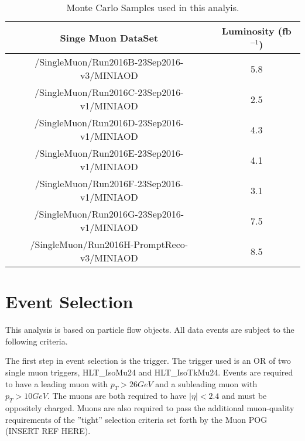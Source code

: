 \documentclass[
10pt, %
a4paper, %
oneside, %
headinclude,footinclude, %
BCOR5mm, %
]{scrartcl}
\begin{document}
\begin{table}[htp]
    \centering
    \label{tab:mcsets}

 \caption{ Monte Carlo Samples used in this analyis.}
\begin{tabular}{|| c c ||}
    \hline
    \textbf{Singe Muon DataSet}  & \textbf{Luminosity (fb$^{-1}$)}\\
 \hline \hline

  /SingleMuon/Run2016B-23Sep2016-v3/MINIAOD   &   {\small 5.8}  \\
  /SingleMuon/Run2016C-23Sep2016-v1/MINIAOD    &  {\small 2.5}  \\
  /SingleMuon/Run2016D-23Sep2016-v1/MINIAOD    &  {\small 4.3}  \\ 
  /SingleMuon/Run2016E-23Sep2016-v1/MINIAOD    &  {\small 4.1}  \\
  /SingleMuon/Run2016F-23Sep2016-v1/MINIAOD    &  {\small 3.1}  \\
  /SingleMuon/Run2016G-23Sep2016-v1/MINIAOD    &  {\small 7.5}  \\
  /SingleMuon/Run2016H-PromptReco-v3/MINIAOD   &  {\small 8.5}  \\  



 \hline

 \end{tabular}

\end{table}

\section{Event Selection}

This analysis is based on particle flow objects. All data events are subject to the following criteria.

The first step in event selection is the trigger. The trigger used is an OR of two single muon triggers, HLT\_IsoMu24 and HLT\_IsoTkMu24. 
Events are required to have a leading muon with $p_T > 26 GeV$ and a subleading muon with $p_T > 10 GeV$. The muons are both required 
to have $|\eta| < 2.4$ and must be oppositely charged. 
Muons are also required to pass the additional muon-quality requirements of the ''tight'' selection 
criteria set forth by the Muon POG (INSERT REF HERE). \\
\end{document}
